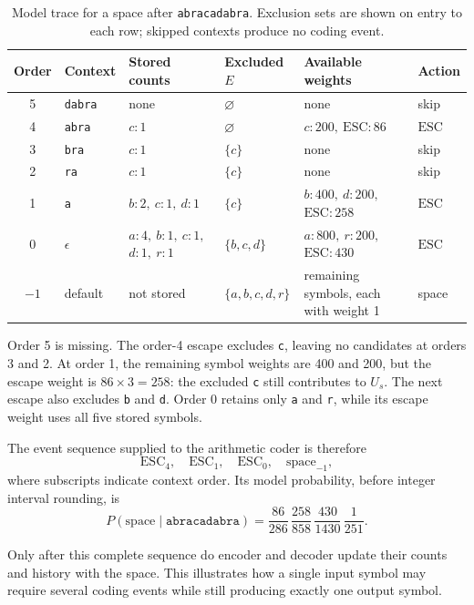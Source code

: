 \documentclass[12pt,onecolumn]{article}
\newcommand{\ESC}{\mathrm{ESC}}
\newcommand{\byte}[1]{\texttt{#1}}
\begin{document}
\begin{table}[htbp]
\centering
\begingroup
{}
\small
\setlength{\tabcolsep}{4pt}
\renewcommand{\arraystretch}{1.35}
\begin{tabularx}{\textwidth}{@{}c l >{\raggedright\arraybackslash}X
  >{\raggedright\arraybackslash}p{2.05cm}
  >{\raggedright\arraybackslash}p{3.55cm} l@{}}
\toprule
Order & Context & Stored counts & Excluded $E$ & Available weights & Action\\
\midrule
5 & \byte{dabra} & none & $\varnothing$ & none & skip\\
4 & \byte{abra} & $c:1$ & $\varnothing$ & $c:200,\ \ESC:86$ & $\ESC$\\
3 & \byte{bra} & $c:1$ & $\{c\}$ & none & skip\\
2 & \byte{ra} & $c:1$ & $\{c\}$ & none & skip\\
1 & \byte{a} & $b:2,\ c:1,\ d:1$ & $\{c\}$ &
  $b:400,\ d:200,$\newline $\ESC:258$ & $\ESC$\\
0 & $\epsilon$ & $a:4,\ b:1,\ c:1,$\newline $d:1,\ r:1$ & $\{b,c,d\}$ &
  $a:800,\ r:200,$\newline $\ESC:430$ & $\ESC$\\
$-1$ & default & not stored & $\{a,b,c,d,r\}$ &
  251 remaining symbols, each with weight 1 & space\\
\bottomrule
\end{tabularx}
\endgroup
\caption{Model trace for a space after \byte{abracadabra}. Exclusion sets are
shown on entry to each row; skipped contexts produce no coding event.}
\label{tab:example}
\end{table}

\begin{samepage}
Order 5 is missing. The order-4 escape excludes \byte{c}, leaving no candidates
at orders 3 and 2. At order 1, the remaining symbol weights are 400 and 200,
but the escape weight is $86\times3=258$: the excluded \byte{c} still contributes
to $U_s$. The next escape also excludes \byte{b} and \byte{d}. Order 0 retains
only \byte{a} and \byte{r}, while its escape weight uses all five stored symbols.
\end{samepage}

\begin{samepage}
The event sequence supplied to the arithmetic coder is therefore
\begin{equation}
  \ESC_{4},\quad \ESC_{1},\quad \ESC_{0},\quad
  \text{space}_{-1},
\end{equation}
where subscripts indicate context order. Its model probability, before integer
interval rounding, is
\begin{equation}
  P(\text{space}\mid\byte{abracadabra})
  =\frac{86}{286}\,\frac{258}{858}\,\frac{430}{1430}\,
    \frac{1}{251}.
\end{equation}
\end{samepage}
Only after this complete sequence do encoder and decoder update their counts
and history with the space. This illustrates how a single input symbol may
require several coding events while still producing exactly one output symbol.
\FloatBarrier
\end{document}
